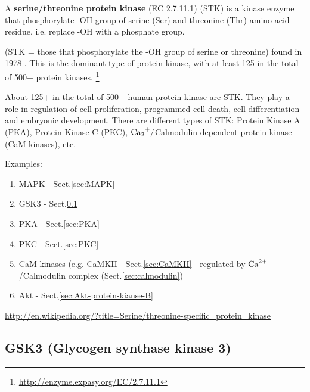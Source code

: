 A {\bf serine/threonine protein kinase} (EC 2.7.11.1) (STK) is a kinase enzyme
that phosphorylate -OH group of serine (Ser) and threonine (Thr) amino acid
residue, i.e. replace -OH with a phosphate group. 

(STK = those that phosphorylate the -OH group of serine or threonine) found in
1978 \citep{klee1978}. This is the dominant type of protein kinase, with at
least 125 in the total of 500+ protein kinases.
\footnote{\url{http://enzyme.expasy.org/EC/2.7.11.1}}

\begin{framed}

About 125+ in the total of 500+ human protein kinase are STK. They play a role
in regulation of cell proliferation, programmed cell death, cell differentiation
and embryonic development. There are different types of STK: Protein Kinase A
(PKA), Protein Kinase C (PKC), $\ce{Ca2+}/$Calmodulin-dependent protein kinase
(CaM kinases), etc.
\end{framed}

Examples:
\begin{enumerate}
  
  \item MAPK - Sect.\ref{sec:MAPK}
  
  \item GSK3 - Sect.\ref{sec:GSK3}

  \item PKA - Sect.\ref{sec:PKA} %
 
  \item PKC - Sect.\ref{sec:PKC}
 
  \item CaM kinases (e.g. CaMKII - Sect.\ref{sec:CaMKII} - regulated by
  ${\text{Ca}^{2+}}$/Calmodulin complex (Sect.\ref{sec:calmodulin})
  
  \item Akt - Sect.\ref{sec:Akt-protein-kianse-B}
\end{enumerate}


\url{http://en.wikipedia.org/?title=Serine/threonine-specific_protein_kinase}

%   

\subsection{GSK3 (Glycogen synthase kinase 3)}
\label{sec:GSK3}
\label{sec:glycogen-synthase-kinase-3}

